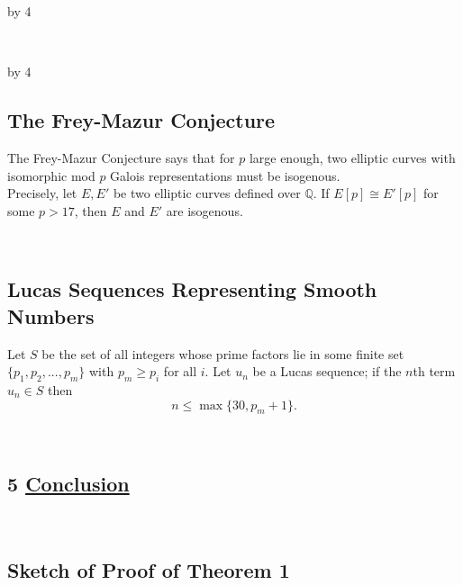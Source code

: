 \documentclass[12pt]{scrartcl}
\def\Q{{\mathbb Q}}
\def\anzspalten{4}
\newlength{\kastenwidth}
\newenvironment{kasten}{%
  \begin{lrbox}{\dummybox}%
    \begin{minipage}{0.96\linewidth}}%
    {\end{minipage}%
  \end{lrbox}%
  \raisebox{-\depth}{\psshadowbox[framesep=1em]{\usebox{\dummybox}}}\\[0.5em]}
\newenvironment{spalte}{%
  \setlength\kastenwidth{1.2\textwidth}
  \divide\kastenwidth by \anzspalten
  \begin{minipage}[t]{\kastenwidth}}{\end{minipage}\hfill}
\begin{document}
\begin{lrbox}{\spalten}
{\begin{spalte}
\begin{kasten}
\end{kasten}

\end{spalte}
    \begin{spalte}

\begin{kasten}

\subsection*{ \color{blue} The Frey-Mazur Conjecture}

The Frey-Mazur Conjecture says that for $p$ large enough, two elliptic curves with isomorphic mod $p$ Galois representations must be isogenous. \\

Precisely, let $E, E'$ be two elliptic curves defined over $\Q$. If $E[p] \cong E'[p]$ for some $p > 17$, then $E$ and $E'$ are isogenous.

\end{kasten}

\begin{kasten}

\subsection*{ \color{blue} Lucas Sequences Representing Smooth Numbers}

Let $S$ be the set of all integers whose prime factors lie in some finite set $\{p_1,p_2,...,p_m\}$ with $p_m \geq p_i$ for all $i$.  Let $u_n$ be a Lucas sequence; if the $n$th term $u_n \in S$ then
\[ n \leq \max\{30, p_m +1 \}. \]

\end{kasten}

\begin{kasten}
 \section*{5 \hspace{0.1cm} {\color{red} \underline{Conclusion
}}}
\end{kasten}

\begin{kasten}

\subsection*{\color{blue} Sketch of Proof of Theorem 1}


\end{kasten}
\end{spalte}}
\end{lrbox}
\end{document}
